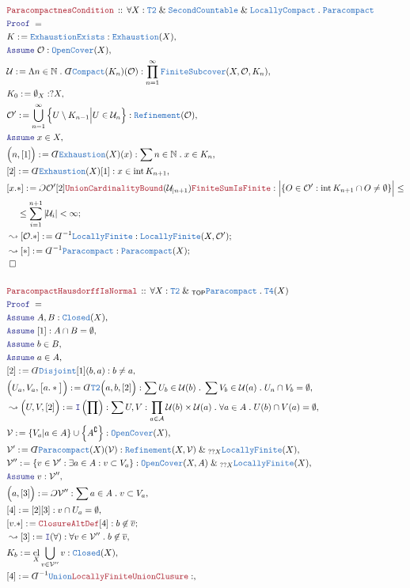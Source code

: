 \documentclass[12pt]{scrartcl}
\newcommand{\TYPE}[1]{\textcolor{NavyBlue}{\mathtt{#1}}}
\newcommand{\LOGIC}[1]{\textcolor{Blue}{\mathtt{#1}}}
\newcommand{\THM}[1]{\textcolor{Maroon}{\mathtt{#1}}}
\renewcommand{\.}{\; . \;}
\newcommand{\de}{: \kern 0.1pc =}
\newcommand{\Act}[1]{\left( #1 \right)}
\newcommand{\Theorem}[2]{& \THM{#1} \, :: \, #2 \\ & \Proof = \\ }
\newcommand{\NewLine}{\\ & \kern 1pc}
\newcommand{\Page}[1]{ \begin{align*} #1 \end{align*}   }
\newcommand{ \bd }{ \ByDef }
\renewcommand{\And}{\; \& \;}
\newcommand{\Intro}{\LOGIC{I}}
\newcommand{\Nat}{\mathbb{N} }
\renewcommand{\c}{\complement}
\newcommand{\Say}[3]{& #1 \de #2 : #3, \\}
\newcommand{\Conclude}[3]{& #1 \de #2 : #3; \\}
\newcommand{\Derive}[3]{& \leadsto #1 \de #2 : #3, \\}
\newcommand{\DeriveConclude}[3]{& \leadsto #1 \de #2 : #3 ; \\}
\newcommand{\Assume}[2]{& \LOGIC{Assume} \; #1 : #2, \\}
\newcommand{\AssumeIn}[2]{& \LOGIC{Assume} \; #1 \in #2, \\}
\newcommand{\QED}{\; \square}
\newcommand{\EndProof}{& \QED \\}
\newcommand{\ByDef}{\rotatebox[origin=c]{-180}{$D$}}%
\newcommand{\ByConstr}{\rotatebox[origin=c]{-180}{$C$}}%
\newcommand{\Proof}{\LOGIC{Proof} \; }
\newcommand{\A}{\mathcal{A}}
\DeclareMathOperator*{\intx}{int}
\DeclareMathOperator*{\cl}{cl}
\newcommand{\TOP}{\mathsf{TOP}}
\newcommand{\U}{\mathcal{U}}
\begin{document}
\Page{
	\Theorem{ParacompactnesCondition}
	{
		\forall X : \TYPE{T2} \And \TYPE{SecondCountable} \And \TYPE{LocallyCompact} \.
		\TYPE{Paracompact}
	}
	\Say{K}{\TYPE{ExhaustionExists}}
	{
		\TYPE{Exhaustion}(X)
	}
	\Assume{\mathcal{O}}{\TYPE{OpenCover}(X)}
	\Say{\U}{\Lambda n \in \Nat \. \bd \TYPE{Compact}(K_n)(\mathcal{O})}
	{
		\prod^\infty_{n=1} \TYPE{FiniteSubcover}(X,\mathcal{O},K_n) 
	}
	\Say{K_0}{\emptyset_X}{?X}
	\Say{\mathcal{O}'}{\bigcup^\infty_{n=1} \Big\{ U \setminus K_{n-1} \Big| U \in \U_n   \Big\}}{\TYPE{Refinement}(\mathcal{O})}
	\AssumeIn{x}{X}
	\Say{\Big(n,[1]\Big)}{\bd \TYPE{Exhaustion}(X)(x)}
	{
		\sum n \in \Nat \. x \in K_n
	}
	\Say{[2]}{\bd \TYPE{Exhaustion}(X)[1]}{x \in \intx K_{n+1}}
	\Conclude{[x.*]}{\ByConstr \mathcal{O}' [2] \THM{UnionCardinalityBound}(\U_{|n+1}) \THM{FiniteSumIsFinite}  }
	{
		\Big| \{ O \in \mathcal{O}' : \intx K_{n+1} \cap O \neq \emptyset \} \Big| \le \NewLine \le \sum^{n+1}_{i=1} |\U_i| < \infty
	}
	\DeriveConclude{[\mathcal{O}.*]}{\bd^{-1}\TYPE{LocallyFinite}}{\TYPE{LocallyFinite}(X,\mathcal{O}')}
	\DeriveConclude{[*]}{\bd^{-1}\TYPE{Paracompact}}
	{
		\TYPE{Paracompact}(X)
	}
	\EndProof
	\\
	\Theorem{ParacompactHausdorffIsNormal}
	{
		\forall X : \TYPE{T2} \And_{\TOP} \TYPE{Paracompact} \.
		\TYPE{T4}(X)
	}
	\Assume{A,B}{\TYPE{Closed}(X)}
	\Assume{[1]}{A \cap B = \emptyset}
	\AssumeIn{b}{B}
	\AssumeIn{a}{A}
	\Say{[2]}{\bd \TYPE{Disjoint}[1](b,a)}{b \neq a}
	\Say{\Big(U_a,V_a,\big[a.*\big]\Big)}
	{\bd \TYPE{T2}\Big(a,b,[2]\Big)}
	{
		\sum U_b \in \U(b) \. 
		\sum V_b \in \U(a)  \.
		U_n \cap V_b = \emptyset
	}
	\Derive{\Big( U,V,[2] \Big)}
	{
		\Intro \Act{\prod}
	}
	{
		\sum U,V : \prod_{a \in \A} \U(b) \times \U(a) \.
		\forall a \in A \. U(b) \cap V(a) = \emptyset
	}
	\Say{\mathcal{V}}{\{ V_a | a \in A \} \cup \Big\{ A^\c \Big\}}
	{ \TYPE{OpenCover}(X) }
	\Say{\mathcal{V}'}{\bd \TYPE{Paracompact}(X)(\mathcal{V})}
	{
		\TYPE{Refinement}(X,\mathcal{V})
		\And_{??X}
		\TYPE{LocallyFinite}(X)
	}
	\Say{\mathcal{V}''}{ \{ v \in \mathcal{V}' : \exists a \in A : v \subset V_a \}   }
	{
		\TYPE{OpenCover}(X,A) \And_{??X} \TYPE{LocallyFinite}(X)
	}
	\Assume{v}{\mathcal{V}''}
	\Say{\Big(a,[3]\Big)}{\ByConstr \mathcal{V}''}
	{
		\sum a \in A \. v \subset V_a
	}
	\Say{[4]}{[2][3]}{v \cap U_a = \emptyset}
	\Conclude{[v.*]}{\THM{ClosureAltDef}[4]}{b \not \in \overline{v} }
	\Derive{[3]}{\Intro(\forall)}{ \forall v \in \mathcal{V}'' \. b \not \in \overline{v}    }
	\Say{K_b}{\cl_X \bigcup_{v \in \mathcal{V}''} v}{\TYPE{Closed}(X)}
	\Say{[4]}{\bd^{-1} \TYPE{Union}\THM{LocallyFiniteUnionClusure}}{
}}
\end{document}
